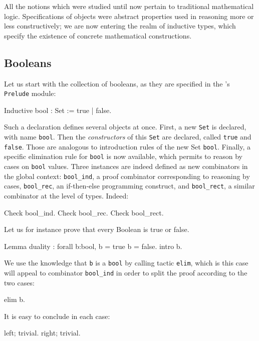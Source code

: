 \documentclass[11pt,a4paper]{book}
\begin{document}
All the notions which were studied until now pertain to traditional
mathematical logic. Specifications of objects were abstract properties
used in reasoning more or less constructively; we are now entering
the realm of inductive types, which specify the existence of concrete
mathematical constructions.

\subsection{Booleans}

Let us start with the collection of booleans, as they are specified
in the \Coq's \verb:Prelude: module:
\begin{coq_example}
Inductive bool :  Set := true | false.
\end{coq_example}

Such a declaration defines several objects at once. First, a new
\verb:Set: is declared, with name \verb:bool:. Then the {\sl constructors}
of this \verb:Set: are declared, called \verb:true: and \verb:false:.
Those are analogous to introduction rules of the new Set \verb:bool:.
Finally, a specific elimination rule for \verb:bool: is now available, which
permits to reason by cases on \verb:bool: values. Three instances are
indeed defined as new combinators in the global context: \verb:bool_ind:,
a proof combinator corresponding to reasoning by cases,
\verb:bool_rec:, an if-then-else programming construct,
and \verb:bool_rect:, a similar combinator at the level of types.
Indeed:
\begin{coq_example}
Check bool_ind.
Check bool_rec.
Check bool_rect.
\end{coq_example}

Let us for instance prove that every Boolean is true or false.
\begin{coq_example}
Lemma duality : forall b:bool, b = true \/ b = false.
intro b.
\end{coq_example}

We use the knowledge that \verb:b: is a \verb:bool: by calling tactic
\verb:elim:, which is this case will appeal to combinator \verb:bool_ind:
in order to split the proof according to the two cases:
\begin{coq_example}
elim b.
\end{coq_example}

It is easy to conclude in each case:
\begin{coq_example}
left; trivial.
right; trivial.
\end{coq_example}
\end{document}
